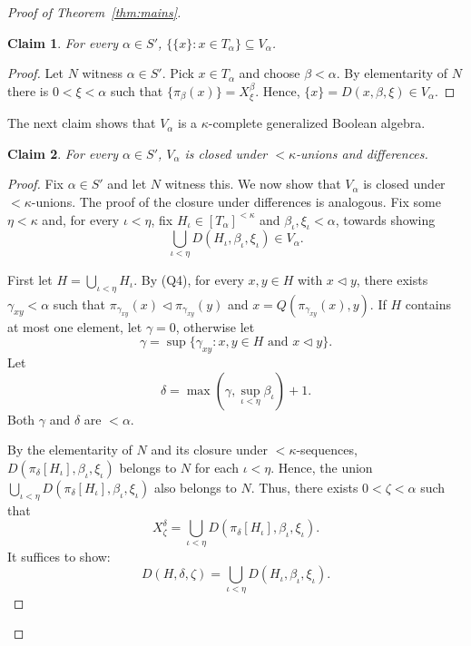 \documentclass[]{amsart}
\newtheorem{claim}{Claim}[theorem]
\theoremstyle{definition}
\theoremstyle{remark}
\begin{document}
\begin{proof}[Proof of Theorem~\ref{thm:mains}]
\begin{claim}\label{claim:3}
For every $\alpha \in S'$, $\{ \{x\} : x \in T_\alpha\} \subseteq V_\alpha$.
\end{claim}
\begin{proof}
Let $N$ witness $\alpha \in S'$. Pick $x \in T_\alpha$ and choose $\beta < \alpha$. By elementarity of $N$ there is $0 < \xi < \alpha$ such that $\{\pi_\beta(x)\} = X^\beta_\xi.$
 Hence, $\{x\} = D(x, \beta, \xi) \in V_\alpha$.
\end{proof}

The next claim shows that $V_\alpha$ is a $\kappa$-complete generalized Boolean algebra.

\begin{claim}\label{claim:4}
For every $\alpha \in S'$, $V_\alpha$ is closed under ${<} \kappa$-unions and differences.
\end{claim}
\begin{proof}

Fix $\alpha \in S'$ and let $N$ witness this. We now show that  $V_\alpha$ is closed under ${<}\kappa$-unions. The proof of the closure under differences is analogous. Fix some $\eta < \kappa$ and, for every $\iota < \eta$, fix $H_\iota \in [T_\alpha]^{<\kappa}$ and $\beta_\iota, \xi_\iota < \alpha$, towards showing 
\[
\bigcup_{\iota < \eta} D(H_\iota, \beta_\iota, \xi_\iota) \in V_\alpha.
\]

First let $H = \bigcup_{\iota < \eta} H_\iota$. By (Q4), for every $x,y \in H$ with $x \lhd y$, there exists $\gamma_{xy} < \alpha$ such that $\pi_{\gamma_{xy}}(x) \lhd \pi_{\gamma_{xy}}(y)$ and $x = Q(\pi_{\gamma_{xy}}(x), y)$. If $H$ contains at most one element, let $\gamma = 0$, otherwise let 
\[
\gamma = \sup\{\gamma_{xy} : x, y \in H \text{ and } x \lhd y\}.
\]
Let 
\[
\delta = \max\left(\gamma, \sup_{\iota < \eta} \beta_\iota\right) + 1.
\]
 Both $\gamma$ and $\delta$ are $< \alpha$.


By the elementarity of $N$ and its closure under ${<}\kappa$-sequences,  $D(\pi_\delta[H_\iota], \beta_\iota, \xi_\iota)$ belongs to $N$ for each $\iota < \eta$. Hence, the union $\bigcup_{\iota < \eta} D(\pi_\delta[H_\iota], \beta_\iota, \xi_\iota)$ also belongs to $N$. Thus, there exists $0 < \zeta < \alpha$ such that 
\[
X^\delta_\zeta = \bigcup_{\iota < \eta} D(\pi_\delta[H_\iota], \beta_\iota, \xi_\iota).
\]
It suffices to show:
\begin{equation}\label{eq:claim4-0}
D(H, \delta, \zeta) = \bigcup_{\iota < \eta} D(H_\iota, \beta_\iota, \xi_\iota).
\end{equation}



\end{proof}
\end{proof}
\end{document}
